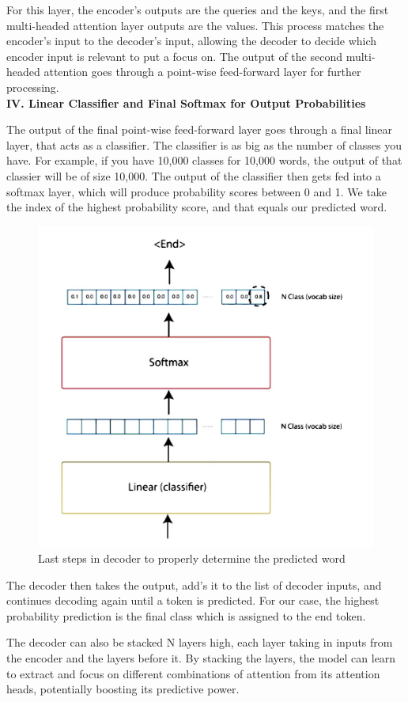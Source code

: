 For this layer, the encoder’s outputs are the queries and the keys, and the first multi-headed attention layer outputs are the values. This process matches the encoder’s input to the decoder’s input, allowing the decoder to decide which encoder input is relevant to put a focus on. The output of the second multi-headed attention goes through a point-wise feed-forward layer for further processing.\\

\noindent
\textbf{IV. Linear Classifier and Final Softmax for Output Probabilities}

The output of the final point-wise feed-forward layer goes through a final linear layer, that acts as a classifier. The classifier is as big as the number of classes you have. For example, if you have 10,000 classes for 10,000 words, the output of that classier will be of size 10,000. The output of the classifier then gets fed into a softmax layer, which will produce probability scores between 0 and 1. We take the index of the highest probability score, and that equals our predicted word.

\begin{figure}[H]
\centering
\includegraphics[width=.55\textwidth]{figures/t15.jpg}
\caption{Last steps in decoder to properly determine the predicted word}
\end{figure}

The decoder then takes the output, add’s it to the list of decoder inputs, and continues decoding again until a token is predicted. For our case, the highest probability prediction is the final class which is assigned to the end token.

The decoder can also be stacked N layers high, each layer taking in inputs from the encoder and the layers before it. By stacking the layers, the model can learn to extract and focus on different combinations of attention from its attention heads, potentially boosting its predictive power.
\newpage

